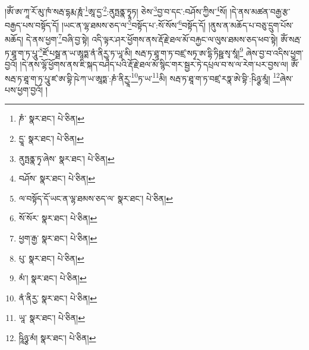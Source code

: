 །ཨོཾ་ཨ་ཀཱ་རོ་མུ་ཁཾ་སརྦ་དྷརྨ་ཎཱཾ་\footnote{ཎཾ་  སྣར་ཐང་།  པེ་ཅིན། }ཨཱ་དྱ་\footnote{དྱཱ་  སྣར་ཐང་།  པེ་ཅིན། }:ནུཏྤནྣ་ཏྭཱཏ། ཅེས་\footnote{ནུཏྤནྣ་ཏྭ་ཞེས་  སྣར་ཐང་།  པེ་ཅིན། }བྱ་བ་དང་:བཤོས་ཀྱིས་\footnote{བཤོས་  སྣར་ཐང་།  པེ་ཅིན། }སོ། །དེ་ནས་མཚན་བརྒྱ་རྩ་བརྒྱད་པས་བསྟོད་དོ། །ཡང་ན་ལྷ་ཐམས་ཅད་ལ་\footnote{ལ་བསྟོད་དོ་ཡང་ན་ལྷ་ཐམས་ཅད་ལ་  སྣར་ཐང་།  པེ་ཅིན། }བསྟོད་པ་:སོ་སོས་\footnote{སོ་སོར་  སྣར་ཐང་།  པེ་ཅིན། }བསྟོད་དོ། །ནུས་ན་མཆོད་པ་བཅུ་དྲུག་པོས་མཆོད། དེ་ནས་ཕྱག་\footnote{ཕྱག་རྒྱ་  སྣར་ཐང་།  པེ་ཅིན། }བཞི་བྱ་སྟེ། འདི་ལྟར་ཤར་ཕྱོགས་ནས་རྡོ་རྗེ་ཐལ་མོ་བརྐྱང་ལ་ལུས་ཐམས་ཅད་ཕབ་སྟེ། ཨོཾ་སརྦ་ཏ་ཐཱ་ག་ཏ་པཱུ་\footnote{པུ་  སྣར་ཐང་།  པེ་ཅིན། }ཛོ་པསྠ་ན་ཡ་ཨཱཏྨ་ནཾ་ནིརྱཱ་ཏ་ཡཱ་མི། སརྦ་ཏ་ཐཱ་ག་ཏ་བཛྲ་སཏྭ་ཨ་དྷི་ཏིཥྛ་སྭ་སཱཾ།\footnote{མཾ་།  སྣར་ཐང་།  པེ་ཅིན། } ཞེས་བྱ་བ་འདིས་ཕྱག་བྱའོ། །དེ་ནས་ལྷོ་ཕྱོགས་ནས་ཇི་སྐད་བཤད་པའི་རྡོ་རྗེ་ཐལ་མོ་སྙིང་གར་སྦྱར་ཏེ་དཔྲལ་བ་ས་ལ་རེག་པར་བྱས་ལ། ཨོཾ་སརྦ་ཏ་ཐཱ་ག་ཏ་པཱུ་ཛ་ཨ་བྷི་ཥེ་ཀ་ཡ་ཨཱཏྨ་:ཎཾ་ནིརྱཱ་\footnote{ནཾ་ནིརྱ་  སྣར་ཐང་།  པེ་ཅིན། }ཏ་ཡ་\footnote{ཡཱ་  སྣར་ཐང་།  པེ་ཅིན། }མི། སརྦ་ཏ་ཐཱ་ག་ཏ་བཛྲ་རཏྣ་ཨེ་བྷི་:ཥིཉྩ་མཱཾ། \footnote{ཥཱིཉྩ་མཾ།   སྣར་ཐང་།  པེ་ཅིན། }ཞེས་པས་ཕྱག་བྱའོ། །
